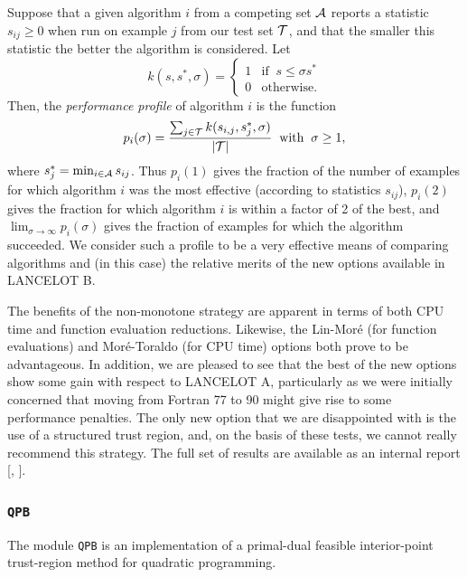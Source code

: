 \documentclass[acmtocl,acmnow]{acmtrans2m}
\newcommand{\lana}{{\sf LANCELOT A}}
\newcommand{\lanb}{{\sf LANCELOT B}}
\newcommand{\ltsubsubsection}[1]{\subsubsection{{\tt #1}} \label{#1}}
\newcommand{\bciteb}[1]{\citeauthor{#1}, \citeyear{#1}}
\newcommand{\calA}{{\cal A}} \newcommand{\calB}{{\cal B}}
\newcommand{\disp}[1]{\[{#1}\]}
\begin{document}
Suppose that a given algorithm $i$ from a competing set $\calA$
reports a statistic $s_{ij} \geq 0$ 
when run on example $j$ from our test set ${\cal T}$,
and that the smaller this statistic the better the algorithm is considered.
Let 
\disp{k(s,s^*,\sigma) = 
 \left\{ 
\begin{array}{rl}
 1 & \mbox{if} \;\; s \leq \sigma s^* \\ 0 & \mbox{otherwise.}
\end{array} 
\right.
}
Then, the {\em performance profile} of algorithm $i$ is the function 
\disp{p_i(\sigma) = \frac{ 
\sum_{j \in \calT} k(s_{i,j},s^*_{j},\sigma)}{|\calT|} \;\;\mbox{with}\;\; 
\sigma \geq 1,}
where $s^*_j = \min_{i \in \calA} s_{ij}$.
Thus $p_i(1)$ gives the fraction of the number of examples for which 
algorithm $i$ was the most effective (according to statistics $s_{ij}$),
$p_i(2)$ gives 
the fraction for which algorithm $i$ 
is within a factor of 2 of the best, and $\lim_{\sigma\longrightarrow\infty}
p_i(\sigma)$ gives the fraction of examples for which the algorithm
succeeded. We consider such a profile to be a very effective means
of comparing algorithms and (in this case)
the relative merits of the new options available in \lanb.

The benefits of the non-monotone strategy
are apparent in terms of both CPU time and function evaluation reductions.
Likewise, the Lin-Mor\'{e} (for function evaluations) 
and Mor\'{e}-Toraldo (for CPU time) options both prove to be advantageous.
In addition, we are pleased to see that 
the best of the new options show some gain with respect to 
\lana, particularly as we were initially concerned that moving from 
Fortran 77 to 90 might give rise to some performance penalties.
The only new option that we are disappointed with is the use of a
structured trust region, and, on the basis of these tests, 
we cannot really recommend this strategy. The full set of results
are available as an internal report [\bciteb{goulorbatoin02c}].

\ltsubsubsection{QPB}

The module {\tt QPB} is an implementation of a primal-dual 
feasible interior-point trust-region method for quadratic programming.
\end{document}
